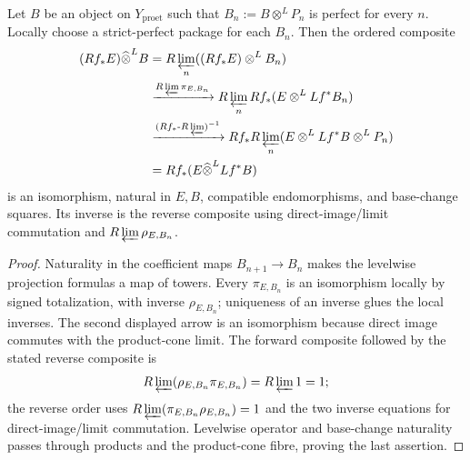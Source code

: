 \begin{lemma}
\label{lemma:weil-pbc-completed-projection-formula-composite}
Let $B$ be an object on $Y_{\mathrm{proet}}$ such that
$B_n:=B\otimes^LP_n$ is perfect for every $n$.  Locally choose a
strict-perfect package for each $B_n$.  Then the ordered composite
\[
\begin{aligned}
 (Rf_*E)\widehat\otimes^LB
 &=R\varprojlim_n((Rf_*E)\otimes^LB_n)\\
 &\xrightarrow{R\varprojlim\pi_{E,B_n}}
 R\varprojlim_nRf_*(E\otimes^LLf^*B_n)\\
 &\xrightarrow{(Rf_*\text{-}R\varprojlim)^{-1}}
 Rf_*R\varprojlim_n(E\otimes^LLf^*B\otimes^LP_n)\\
 &=Rf_*(E\widehat\otimes^LLf^*B)
\end{aligned}
\]
is an isomorphism, natural in $E,B$, compatible endomorphisms, and base-change
squares.
Its inverse is the reverse composite using direct-image/limit commutation
and $R\varprojlim\rho_{E,B_n}$.
\end{lemma}
\begin{proof}

Naturality in the coefficient maps $B_{n+1}\to B_n$ makes the levelwise
projection formulas a map of towers.  Every $\pi_{E,B_n}$ is an isomorphism
locally by signed totalization, with inverse $\rho_{E,B_n}$; uniqueness of
an inverse glues the local inverses.  The second displayed arrow is an
isomorphism because direct image commutes with the product-cone limit.  The
forward composite followed by the stated reverse composite is
\[
 R\varprojlim(\rho_{E,B_n}\pi_{E,B_n})=R\varprojlim1=1;
\]
the reverse order uses
$R\varprojlim(\pi_{E,B_n}\rho_{E,B_n})=1$ and the two inverse equations for
direct-image/limit commutation.  Levelwise operator and base-change
naturality passes through products and the product-cone fibre, proving the
last assertion.
\end{proof}

